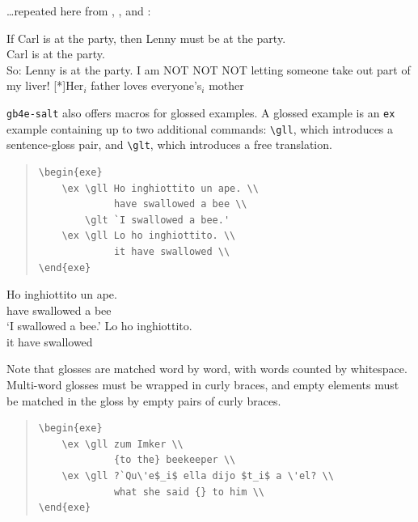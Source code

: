\documentclass{salt}
\begin{document}
\ldots repeated here from , 
    , and :
\begin{exe}
     If Carl is at the party, then Lenny 
                   must be at the party. \\
               Carl is at the party. \\
               So: Lenny is at the party.
     I am NOT NOT NOT letting someone take 
                   out part of my liver!
    [*]{Her$_i$ father loves everyone's$_i$ mother}
\end{exe}

\verb+gb4e-salt+ also offers macros for glossed examples. A glossed example is an \verb+ex+ example containing up to two additional commands: \verb+\gll+, which introduces a sentence-gloss pair, and \verb+\glt+, which introduces a free translation.

\begin{quote}
\small
\begin{verbatim}
\begin{exe}
    \ex \gll Ho inghiottito un ape. \\
             have swallowed a bee \\
        \glt `I swallowed a bee.'
    \ex \gll Lo ho inghiottito. \\
             it have swallowed \\
\end{exe}
\end{verbatim}
\end{quote}

\begin{exe}
    \ex \gll Ho inghiottito un ape. \\
             have swallowed a bee \\
        \glt `I swallowed a bee.'
    \ex \gll Lo ho inghiottito. \\
             it have swallowed \\
\end{exe}


Note that glosses are matched word by word, with words counted by whitespace. Multi-word glosses must be wrapped in curly braces, and empty elements must be matched in the gloss by empty pairs of curly braces.

\begin{quote}
\small
\begin{verbatim}
\begin{exe}
    \ex \gll zum Imker \\
             {to the} beekeeper \\
    \ex \gll ?`Qu\'e$_i$ ella dijo $t_i$ a \'el? \\
             what she said {} to him \\
\end{exe}
\end{verbatim}
\end{quote}
\end{document}
